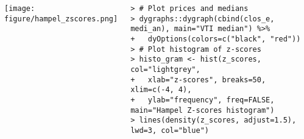 \documentclass[10pt]{beamer}\usepackage[]{graphicx}\usepackage[]{color}
\makeatletter
\newenvironment{kframe}{%
 \def\at@end@of@kframe{}%
 \ifinner\ifhmode%
  \def\at@end@of@kframe{\end{minipage}}%
  \begin{minipage}{\columnwidth}%
 \fi\fi%
 \def\FrameCommand##1{\hskip\@totalleftmargin \hskip-\fboxsep
 \colorbox{shadecolor}{##1}\hskip-\fboxsep
     \hskip-\linewidth \hskip-\@totalleftmargin \hskip\columnwidth}%
 \MakeFramed {\advance\hsize-\width
   \@totalleftmargin\z@ \linewidth\hsize
   \@setminipage}}%
 {\par\unskip\endMakeFramed%
 \at@end@of@kframe}
\newenvironment{knitrout}{}{} %
\makeatother
\begin{document}
\begin{frame}[fragile,t]{\subsecname}
\begin{block}{}
\begin{columns}[T]
      \texttt{[image: figure/hampel\_zscores.png]}\\
      \vspace{-1em}
\begin{knitrout}\tiny
{}\color{fgcolor}\begin{kframe}
\begin{verbatim}
> # Plot prices and medians
> dygraphs::dygraph(cbind(clos_e, medi_an), main="VTI median") %>%
+   dyOptions(colors=c("black", "red"))
> # Plot histogram of z-scores
> histo_gram <- hist(z_scores, col="lightgrey",
+   xlab="z-scores", breaks=50, xlim=c(-4, 4),
+   ylab="frequency", freq=FALSE, main="Hampel Z-scores histogram")
> lines(density(z_scores, adjust=1.5), lwd=3, col="blue")
\end{verbatim}
\end{kframe}
\end{knitrout}
  \end{columns}
\end{block}

\end{frame}


\end{document}
